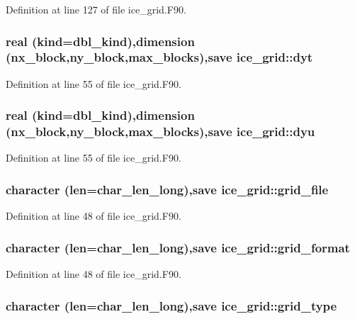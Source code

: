 Definition at line 127 of file ice\_\-grid.F90.\hypertarget{namespaceice__grid_ae46b1f5dbbef49a552a33a86b1f887b8}{
\subsubsection[{dyt}]{\setlength{\rightskip}{0pt plus 5cm}real (kind=dbl\_\-kind),dimension (nx\_\-block,ny\_\-block,max\_\-blocks),save {\bf ice\_\-grid::dyt}}}
\label{namespaceice__grid_ae46b1f5dbbef49a552a33a86b1f887b8}


Definition at line 55 of file ice\_\-grid.F90.\hypertarget{namespaceice__grid_ad2b38c10d13244b2b4da1e461c2ef207}{
\subsubsection[{dyu}]{\setlength{\rightskip}{0pt plus 5cm}real (kind=dbl\_\-kind),dimension (nx\_\-block,ny\_\-block,max\_\-blocks),save {\bf ice\_\-grid::dyu}}}
\label{namespaceice__grid_ad2b38c10d13244b2b4da1e461c2ef207}


Definition at line 55 of file ice\_\-grid.F90.\hypertarget{namespaceice__grid_ac080d4ddf9dfc9375611416d1c425155}{
\subsubsection[{grid\_\-file}]{\setlength{\rightskip}{0pt plus 5cm}character (len=char\_\-len\_\-long),save {\bf ice\_\-grid::grid\_\-file}}}
\label{namespaceice__grid_ac080d4ddf9dfc9375611416d1c425155}


Definition at line 48 of file ice\_\-grid.F90.\hypertarget{namespaceice__grid_af3bcebba9676775105d70d32996d3ce5}{
\subsubsection[{grid\_\-format}]{\setlength{\rightskip}{0pt plus 5cm}character (len=char\_\-len\_\-long),save {\bf ice\_\-grid::grid\_\-format}}}
\label{namespaceice__grid_af3bcebba9676775105d70d32996d3ce5}


Definition at line 48 of file ice\_\-grid.F90.\hypertarget{namespaceice__grid_a927cd355e5ebbeb5b943262b4d8a1c74}{
\subsubsection[{grid\_\-type}]{\setlength{\rightskip}{0pt plus 5cm}character (len=char\_\-len\_\-long),save {\bf ice\_\-grid::grid\_\-type}}}
\label{namespaceice__grid_a927cd355e5ebbeb5b943262b4d8a1c74}


